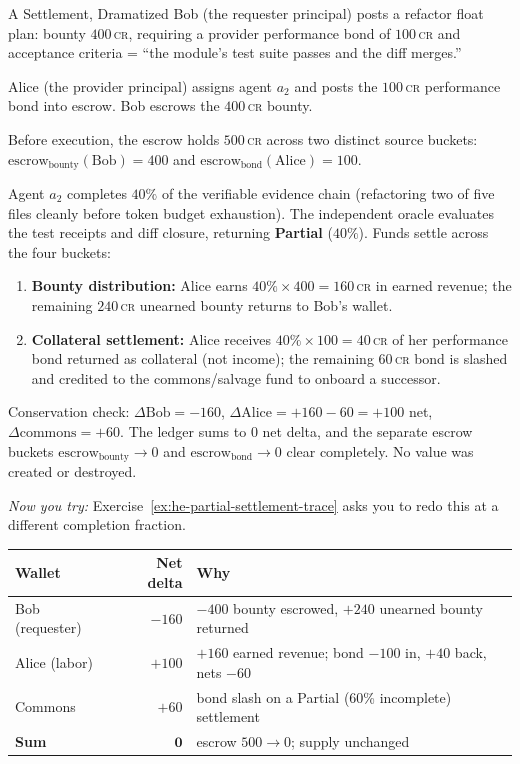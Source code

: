 \documentclass[11pt,a4paper]{article}
\theoremstyle{definition}
\theoremstyle{definition}
\theoremstyle{remark}
\begin{document}
\begin{pdexample}{A Settlement, Dramatized}
\setlength{\parskip}{4pt plus 1pt}
Bob (the requester principal) posts a refactor float plan: bounty $400$\,\textsc{cr}, requiring a provider performance bond of $100$\,\textsc{cr} and acceptance criteria = ``the module's test suite passes and the diff merges.''

Alice (the provider principal) assigns agent $a_2$ and posts the $100$\,\textsc{cr} performance bond into escrow. Bob escrows the $400$\,\textsc{cr} bounty.

Before execution, the escrow holds $500$\,\textsc{cr} across two distinct source buckets: $\text{escrow}_{\text{bounty}}(\text{Bob}) = 400$ and $\text{escrow}_{\text{bond}}(\text{Alice}) = 100$.

Agent $a_2$ completes $40\%$ of the verifiable evidence chain (refactoring two of five files cleanly before token budget exhaustion). The independent oracle evaluates the test receipts and diff closure, returning \textbf{Partial} ($40\%$). Funds settle across the four buckets:
\begin{enumerate}[nosep]
  \item \textbf{Bounty distribution:} Alice earns $40\% \times 400 = 160$\,\textsc{cr} in earned revenue; the remaining $240$\,\textsc{cr} unearned bounty returns to Bob's wallet.
  \item \textbf{Collateral settlement:} Alice receives $40\% \times 100 = 40$\,\textsc{cr} of her performance bond returned as collateral (not income); the remaining $60$\,\textsc{cr} bond is slashed and credited to the commons/salvage fund to onboard a successor.
\end{enumerate}

Conservation check: $\Delta \text{Bob} = -160$, $\Delta \text{Alice} = +160 - 60 = +100$ net, $\Delta \text{commons} = +60$. The ledger sums to $0$ net delta, and the separate escrow buckets $\text{escrow}_{\text{bounty}} \to 0$ and $\text{escrow}_{\text{bond}} \to 0$ clear completely. No value was created or destroyed.

\emph{Now you try:} Exercise~\ref{ex:he-partial-settlement-trace} asks you to redo this at a different completion fraction.

\begin{center}\small
\begin{tabularx}{\textwidth}{@{}>{\raggedright\arraybackslash}p{4.0cm} r >{\raggedright\arraybackslash}X@{}}
\toprule
\textbf{Wallet} & \textbf{Net delta} & \textbf{Why} \\
\midrule
Bob (requester)   & $-160$ & $-400$ bounty escrowed, $+240$ unearned bounty returned \\
Alice (labor)     & $+100$ & $+160$ earned revenue; bond $-100$ in, $+40$ back, nets $-60$ \\
Commons           & $+60$  & bond slash on a Partial (60\% incomplete) settlement \\
\midrule
\textbf{Sum}      & $\mathbf{0}$ & escrow $500 \to 0$; supply unchanged \\
\bottomrule
\end{tabularx}
\end{center}
\end{pdexample}
\end{document}
